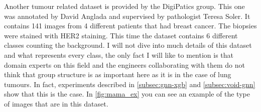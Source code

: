 Another tumour related dataset is provided by the DigiPatics group. This one was annotated by David Anglada and supervised by pathologist Teresa Soler. It contains 141 images from 4 different patients that had breast cancer. The biopsies were stained with HER2 staining. This time the dataset contains 6 different classes counting the background. I will not dive into much details of this dataset and what represents every class, the only fact I will like to mention is that domain experts on this field and the engineers collaborating with them do not think that group structure is as important here as it is in the case of lung tumours. In fact, experiments described in \autoref{subsec:gnn-xgb} and \autoref{subsec:void-gnn} show that this is the case. In \autoref{fig:mama_ex} you can see an example of the type of images that are in this dataset.

